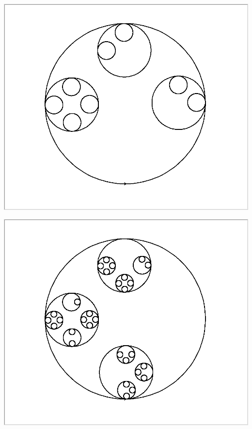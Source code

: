 \documentclass[11pt,class=report,crop=false]{standalone}
\begin{document}
\begin{activite}
\begin{enumerate}
\begin{center}
\includegraphics[scale=\myscale,scale=0.14]{ecran_tortue_cercle3}

\includegraphics[scale=\myscale,scale=0.25]{ecran_tortue_cercle4}
\end{center}  
  
\end{enumerate}
 
\end{activite}
\end{document}

